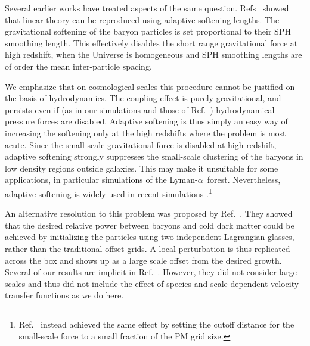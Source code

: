 \documentclass[a4paper,11pt]{article}
\newcommand{\Lya}{Lyman-$\alpha$}
\begin{document}


Several earlier works have treated aspects of the same question. Refs~\cite{OLeary:2012, Angulo:2013} showed that linear theory can be reproduced using adaptive softening lengths. The gravitational softening of the baryon particles is set proportional to their SPH smoothing length. This effectively disables the short range gravitational force at high redshift, when the Universe is homogeneous and SPH smoothing lengths are of order the mean inter-particle spacing.

We emphasize that on cosmological scales this procedure cannot be justified on the basis of hydrodynamics. The coupling effect is purely gravitational, and persists even if (as in our simulations and those of Ref.~\cite{Angulo:2013}) hydrodynamical pressure forces are disabled. Adaptive softening is thus simply an easy way of increasing the softening only at the high redshifts where the problem is most acute. Since the small-scale gravitational force is disabled at high redshift, adaptive softening strongly suppresses the small-scale clustering of the baryons in low density regions outside galaxies. This may make it unsuitable for some applications, in particular simulations of the \Lya~forest. Nevertheless, adaptive softening is widely used in recent simulations \cite[e.g][]{Paco:2018}.\footnote{Ref.~\cite{Valkenburg:2017} instead achieved the same effect by setting the cutoff distance for the small-scale force to a small fraction of the PM grid size.}

An alternative resolution to this problem was proposed by Ref.~\cite{Yoshida:2003}. They showed that the desired relative power between baryons and cold dark matter could be achieved by initializing the particles using two independent Lagrangian glasses, rather than the traditional offset grids. A local perturbation is thus replicated across the box and shows up as a large scale offset from the desired growth. Several of our results are implicit in Ref.~\cite{Yoshida:2003}. However, they did not consider large scales and thus did not include the effect of species and scale dependent velocity transfer functions as we do here.
\end{document}
